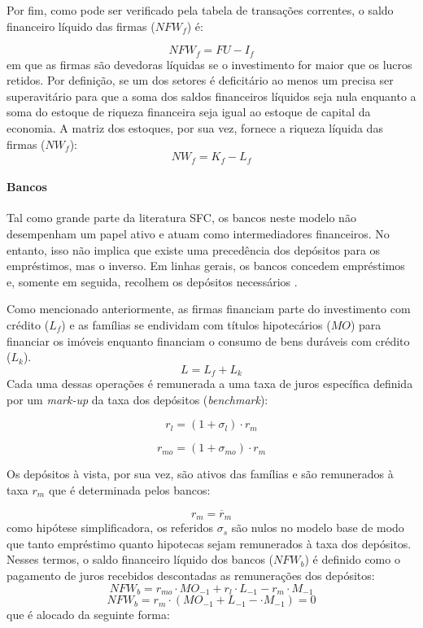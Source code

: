 Por fim, como pode ser verificado pela tabela de transações correntes, o saldo financeiro líquido das firmas ($NFW_f$) é:

\begin{equation}
    NFW_f = FU - I_f
\end{equation}
em que as firmas são devedoras líquidas se o investimento for maior que os lucros retidos. Por definição, se um dos setores é deficitário ao menos um precisa ser superavitário para que a soma dos saldos financeiros líquidos seja nula enquanto a soma do estoque de riqueza financeira seja igual ao estoque de capital da economia. A matriz dos estoques, por sua vez, fornece a riqueza líquida das firmas ($NW_f$):
\begin{equation}
    NW_f = K_f - L_f
\end{equation}

\paragraph*{Bancos} Tal como grande parte da literatura SFC, os bancos neste modelo não desempenham um papel ativo e atuam como intermediadores financeiros. No entanto, isso não implica que existe uma precedência dos depósitos para os empréstimos, mas o inverso. Em linhas gerais, os bancos concedem empréstimos e, somente em seguida, recolhem os depósitos necessários \cite{le_bourva_money_1992}. 

Como mencionado anteriormente, as firmas financiam parte do investimento com crédito ($L_f$) e as famílias se endividam com títulos hipotecários ($MO$) para financiar os imóveis enquanto financiam o consumo de bens duráveis com crédito ($L_k$). 
\begin{equation}
L = L_f + L_k
\end{equation}
Cada uma dessas operações é remunerada a uma taxa de juros específica definida por um \textit{mark-up} da taxa dos depósitos (\textit{benchmark}):

\begin{equation}
    r_l = (1+\sigma_l)\cdot r_m
\end{equation}

\begin{equation}
    r_{mo} = (1+\sigma_{mo})\cdot r_m
\end{equation}

Os depósitos à vista, por sua vez, são ativos das famílias e são remunerados à taxa $r_m$ que é determinada pelos bancos:

\begin{equation}
    r_m = \overline r_m
\end{equation}
como hipótese simplificadora, os referidos $\sigma_s$ são nulos no modelo base de modo que tanto empréstimo quanto hipotecas sejam remunerados à taxa dos depósitos. Nesses termos, o saldo financeiro líquido dos bancos ($NFW_b$) é definido como o pagamento de juros recebidos descontadas as remunerações dos depósitos:
\begin{equation}
    NFW_b = r_{mo}\cdot MO_{-1} + r_l\cdot L_{-1} - r_m\cdot M_{-1}
\end{equation}
$$
    NFW_b = r_{m}\cdot (MO_{-1} + L_{-1} - \cdot M_{-1}) = 0
$$
que é alocado da seguinte forma:

